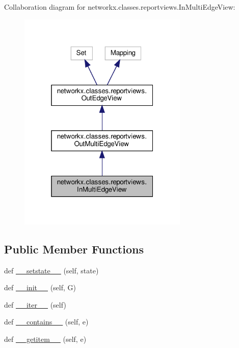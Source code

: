 Collaboration diagram for networkx.\+classes.\+reportviews.\+In\+Multi\+Edge\+View\+:
\nopagebreak
\begin{figure}[H]
\begin{center}
\leavevmode
\includegraphics[width=229pt]{classnetworkx_1_1classes_1_1reportviews_1_1InMultiEdgeView__coll__graph}
\end{center}
\end{figure}
\subsection*{Public Member Functions}
\begin{DoxyCompactItemize}
\item 
def \hyperlink{classnetworkx_1_1classes_1_1reportviews_1_1InMultiEdgeView_ac7e364580ef0c607fc38037cba9d2cc5}{\+\_\+\+\_\+setstate\+\_\+\+\_\+} (self, state)
\item 
def \hyperlink{classnetworkx_1_1classes_1_1reportviews_1_1InMultiEdgeView_a5947cb1c52cc6ddf9aafd1c88ecfc144}{\+\_\+\+\_\+init\+\_\+\+\_\+} (self, G)
\item 
def \hyperlink{classnetworkx_1_1classes_1_1reportviews_1_1InMultiEdgeView_ae4d12c9d6f9f3ae40f40823ab41b5fe2}{\+\_\+\+\_\+iter\+\_\+\+\_\+} (self)
\item 
def \hyperlink{classnetworkx_1_1classes_1_1reportviews_1_1InMultiEdgeView_a3b69efe52edacb1efd7fe99cd5938220}{\+\_\+\+\_\+contains\+\_\+\+\_\+} (self, e)
\item 
def \hyperlink{classnetworkx_1_1classes_1_1reportviews_1_1InMultiEdgeView_a423e8aab5dae9b81998dd2f2bfec34e9}{\+\_\+\+\_\+getitem\+\_\+\+\_\+} (self, e)
\end{DoxyCompactItemize}
